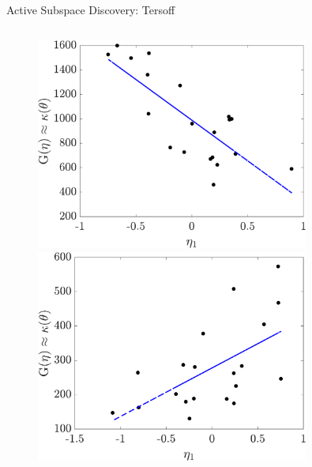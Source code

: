 \documentclass[handout,xcolor={x11names,table},compress,svgnames,mathserif]{beamer}
\renewcommand{\(}{\begin{columns}}
\renewcommand{\)}{\end{columns}}
\newcommand{\<}[1]{\begin{column}{#1}}
\renewcommand{\>}{\end{column}}
\begin{document}
\begin{frame}{Active Subspace Discovery: Tersoff}
\begin{columns}
\begin{column}{0.5\textwidth}
\begin{figure}[htbp]
\begin{center}
\includegraphics[width=0.8\textwidth]{./Figures/SSP_tersoff_k200}
\\
\includegraphics[width=0.8\textwidth]{./Figures/SSP_tersoff_k800}
\end{center}
\end{figure}
%

\end{column}
\end{columns}

\end{frame}

\end{document}

